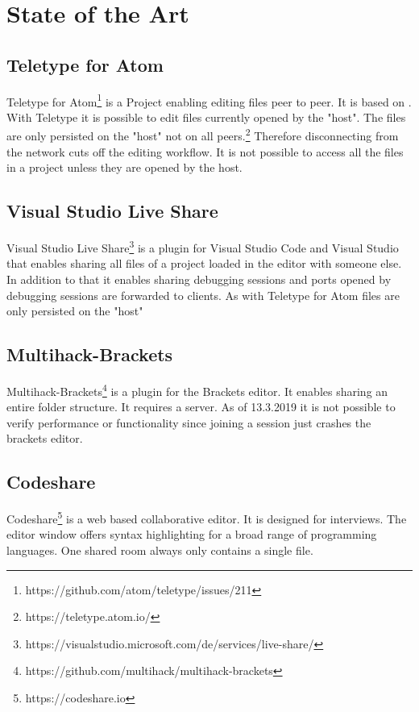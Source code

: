 \section{State of the Art}
\begin{samepage}

	\subsection{Teletype for Atom}
	Teletype for Atom\footnote{https://github.com/atom/teletype/issues/211} is a Project enabling editing files peer to peer. It is based on 	\cite{Oster:2006:DataconsistencyforP2Pcollaborativeediting} \cite{YuWeihai:2014} \cite{BriotUrsoShapiro:2016:HighResponsivenessGroupEditing}.
	With Teletype it is possible to edit files currently opened by the "host". The files are only persisted on the "host" not on all peers.\footnote{https://teletype.atom.io/}
	Therefore disconnecting from the network cuts off the editing workflow. It is not possible to access all the files in a project unless they are opened by the host. 
	\subsection{Visual Studio Live Share}
	Visual Studio Live Share\footnote{https://visualstudio.microsoft.com/de/services/live-share/}  is a plugin for Visual Studio Code and Visual Studio that enables sharing all files of a project loaded in the editor with someone else. In addition to that it enables sharing debugging sessions and ports opened by debugging sessions are forwarded to clients. As with Teletype for Atom files are only persisted on the "host"  
	\subsection{Multihack-Brackets}
	Multihack-Brackets\footnote{https://github.com/multihack/multihack-brackets} is a plugin for the Brackets editor. It enables sharing an entire folder structure. It requires a server. As of 13.3.2019 it is not possible to verify performance or functionality since joining a session just crashes the brackets editor. 
	\subsection{Codeshare}
	Codeshare\footnote{https://codeshare.io} is a web based collaborative editor. It is designed for interviews. The editor window offers syntax highlighting for a broad range of programming languages. One shared room always only contains a single file. 

\end{samepage}
